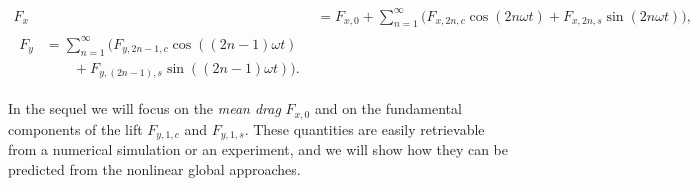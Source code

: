 \documentclass[twocolumn,10pt]{asme2ej}
\newcommand{\be}[1]{ \begin{equation} \label{#1}}
\newcommand{\ee}{\end{equation}}
\begin{document}
\begin{align}
F_x &=F_{x,0} + \sum_{n=1}^\infty \big( F_{x,2n,c} \cos ( 2 n \omega t) + F_{x,2n,s} \sin( 2 n  \omega t ) \big),
\\
\begin{split}
F_y  & =\sum_{n=1}^\infty \big( F_{y,{2n-1},c} \cos ((2n-1) \omega t )\\
             &\qquad + F_{y,(2n-1),s}  \sin ((2n-1) \omega t) \big).
\end{split}
\label{drag_lift_def}
\end{align}



In the sequel we will focus on the {\em mean drag}  $F_{x,0}$ and on the fundamental components of the lift  
$F_{y,1,c}$ and $F_{y,1,s}$. These quantities are easily retrievable from a numerical simulation or an experiment, and we will show how they can be predicted from the nonlinear global approaches.
 
  

   




\end{document}
